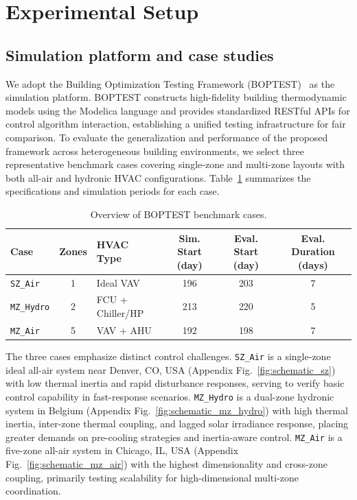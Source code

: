 \documentclass[a4paper]{cas-sc}
\begin{document}
\section{Experimental Setup}
\label{sec:experiments}

\subsection{Simulation platform and case studies}

We adopt the Building Optimization Testing Framework (BOPTEST)~\cite{Blum2021-nx} as the simulation platform. BOPTEST constructs high-fidelity building thermodynamic models using the Modelica language and provides standardized RESTful APIs for control algorithm interaction, establishing a unified testing infrastructure for fair comparison. To evaluate the generalization and performance of the proposed framework across heterogeneous building environments, we select three representative benchmark cases covering single-zone and multi-zone layouts with both all-air and hydronic HVAC configurations. Table~\ref{tab:cases} summarizes the specifications and simulation periods for each case.

\begin{table}[htbp]
    \centering
    \caption{Overview of BOPTEST benchmark cases.}
    \label{tab:cases}
    \renewcommand{\arraystretch}{1.3}
    \begin{tabularx}{\textwidth}{l c l c c c}
        \toprule
        \textbf{Case} & \textbf{Zones} & \textbf{HVAC Type} & \textbf{Sim. Start (day)} & \textbf{Eval. Start (day)} & \textbf{Eval. Duration (days)} \\
        \midrule
        \texttt{SZ\_Air}   & 1 & Ideal VAV           & 196 & 203 & 7 \\
        \texttt{MZ\_Hydro} & 2 & FCU + Chiller/HP    & 213 & 220 & 5 \\
        \texttt{MZ\_Air}   & 5 & VAV + AHU           & 192 & 198 & 7 \\
        \bottomrule
    \end{tabularx}
\end{table}

The three cases emphasize distinct control challenges. \texttt{SZ\_Air} is a single-zone ideal all-air system near Denver, CO, USA (Appendix Fig.~\ref{fig:schematic_sz}) with low thermal inertia and rapid disturbance responses, serving to verify basic control capability in fast-response scenarios. \texttt{MZ\_Hydro} is a dual-zone hydronic system in Belgium (Appendix Fig.~\ref{fig:schematic_mz_hydro}) with high thermal inertia, inter-zone thermal coupling, and lagged solar irradiance response, placing greater demands on pre-cooling strategies and inertia-aware control. \texttt{MZ\_Air} is a five-zone all-air system in Chicago, IL, USA (Appendix Fig.~\ref{fig:schematic_mz_air}) with the highest dimensionality and cross-zone coupling, primarily testing scalability for high-dimensional multi-zone coordination.
\end{document}
